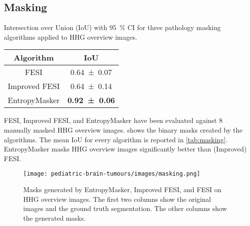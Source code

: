 \subsection{Masking}

\begin{margintable}
    \centering
    \caption[IoU of masks generated by EntropyMasker, Improved FESI, and FESI]{
        Intersection over Union (IoU) with \qty{95}{\percent} CI for three pathology masking algorithms applied to HHG overview images.
    }
    \label{tab:masking}
    \begin{tabular}[\linewidth]{cc}
        \toprule
        Algorithm & IoU \\
        \midrule
        FESI & \num{0.64 \pm 0.07} \\
        Improved FESI & \num{0.64 \pm 0.14} \\
        EntropyMasker & \textbf{\num{0.92 \pm 0.06}} \\
        \bottomrule
    \end{tabular}
\end{margintable}

FESI, Improved FESI, and EntropyMasker have been evaluated against 8 manually masked HHG overview images.
 shows the binary masks created by the algorithms.
The mean IoU for every algorithm is reported in \cref{tab:masking}.
EntropyMasker masks HHG overview images significantly better than (Improved) FESI.

\begin{figure*}
    \centering
    \texttt{[image: pediatric-brain-tumours/images/masking.png]}
    \caption[Masks generated by EntropyMasker, Improved FESI, and FESI]{
        Masks generated by EntropyMasker, Improved FESI, and FESI on HHG overview images.
        The first two columns show the original images and the ground truth segmentation.
        The other columns show the generated masks.
    }
    \label{fig:masking-results}
\end{figure*}